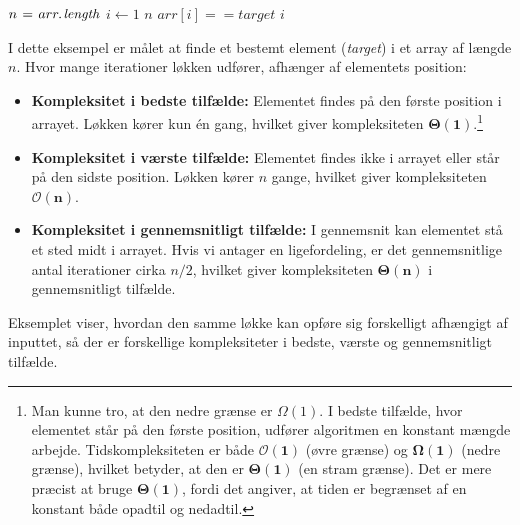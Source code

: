 \begin{example}

    \begin{codebox}
        \li $n \gets \attrib{arr}{length}$
        \li \For $i \gets 1$ \To $n$ \Do
        \li     \If $arr[i] == target$ \Then
        \li         \Return $i$ 
                \End
            \End
    \end{codebox}

    I dette eksempel er målet at finde et bestemt element (\emph{target}) i et array af længde $n$. Hvor mange iterationer løkken udfører, afhænger af elementets position:

    \begin{itemize}
        \item \textbf{Kompleksitet i bedste tilfælde:} Elementet findes på den første position i arrayet. Løkken kører kun én gang, hvilket giver kompleksiteten $\boldsymbol{\Theta(1)}$.\footnote{Man kunne tro, at den nedre grænse er $\Omega(1)$. I bedste tilfælde, hvor elementet står på den første position, udfører algoritmen en konstant mængde arbejde. Tidskompleksiteten er både $\boldsymbol{\mathcal{O}(1)}$ (øvre grænse) og $\boldsymbol{\Omega(1)}$ (nedre grænse), hvilket betyder, at den er $\boldsymbol{\Theta(1)}$ (en stram grænse). Det er mere præcist at bruge $\boldsymbol{\Theta(1)}$, fordi det angiver, at tiden er begrænset af en konstant både opadtil og nedadtil.}
        \item \textbf{Kompleksitet i værste tilfælde:} Elementet findes ikke i arrayet eller står på den sidste position. Løkken kører $n$ gange, hvilket giver kompleksiteten $\boldsymbol{\mathcal{O}(n)}$.
        \item \textbf{Kompleksitet i gennemsnitligt tilfælde:} I gennemsnit kan elementet stå et sted midt i arrayet. Hvis vi antager en ligefordeling, er det gennemsnitlige antal iterationer cirka $n/2$, hvilket giver kompleksiteten $\boldsymbol{\Theta(n)}$ i gennemsnitligt tilfælde.
    \end{itemize}    

    Eksemplet viser, hvordan den samme løkke kan opføre sig forskelligt afhængigt af inputtet, så der er forskellige kompleksiteter i bedste, værste og gennemsnitligt tilfælde.
\end{example}

